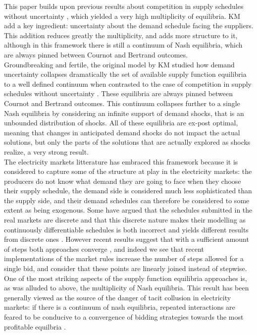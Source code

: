 This paper builds upon previous results about competition in supply schedules without uncertainty \cite{grossman1981nash}, which yielded a very high multiplicity of equilibria. KM add a key ingredient: uncertainty about the demand schedule facing the suppliers. This addition reduces greatly the multiplicity, and adds more structure to it, although in this framework there is still a continuum of Nash equilibria, which are always pinned between Cournot and Bertrand outcomes. \\

Groundbreaking and fertile, the original model by KM studied how demand uncertainty collapses dramatically the set of available supply function equilibria to a well defined continuum when contrasted to the case of competition in supply schedules without uncertainty \cite{grossman1981nash}. These equilibria are always pinned between Cournot and Bertrand outcomes. This continuum collapses further to a single Nash equilibria by considering an infinite support of demand shocks, that is an unbounded distribution of shocks. All of these equilibria are ex-post optimal, meaning that changes in anticipated demand shocks do not impact the actual solutions, but only the parts of the solutions that are actually explored as shocks realize, a very strong result. \\

The electricity markets litterature has embraced this framework because it is considered to capture some of the structure at play in the electricity markets: the producers do not know what demand they are going to face when they choose their supply schedule, the demand side is considered much less sophisticated than the supply side, and their demand schedules can therefore be considered to some extent as being exogenous. Some have argued that the schedules submitted in the real markets are discrete and that this discrete nature makes their modelling as continuously differentiable schedules is both incorrect and yields different results from discrete ones \cite{von1993spot}. However recent results suggest that with a sufficient amount of steps both approaches converge \cite{holmberg2008supply}, and indeed we see that recent implementations of the market rules increase the number of steps allowed for a single bid, and consider that these points are linearly joined instead of stepwise.\\

One of the most striking aspects of the supply function equilibria approaches is, as was alluded to above, the multiplicity of Nash equilibria. This result has been generally viewed as the source of the danger of tacit collusion in electricity markets: if there is a continuum of nash equilibria, repeated interactions are feared to be conducive to a convergence of bidding strategies towards the most profitable equilbria \cite{bolle1992supply}. \\

